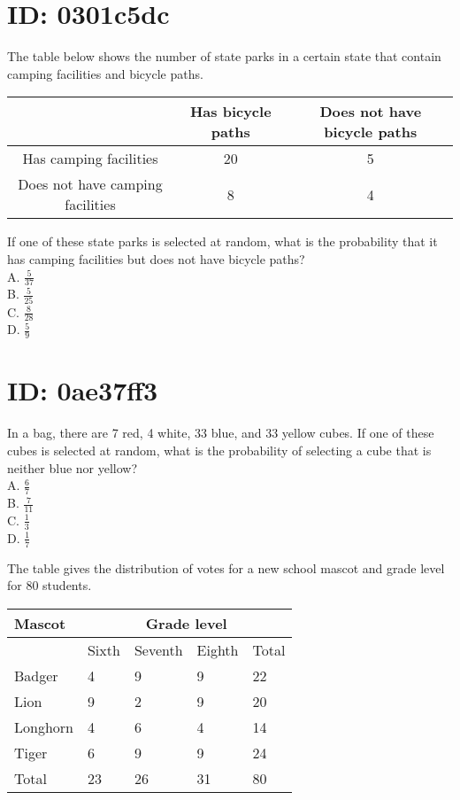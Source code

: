 \section*{ID: 0301c5dc}
The table below shows the number of state parks in a certain state that contain camping facilities and bicycle paths.

\begin{center}
\begin{tabular}{|c|c|c|}
\hline
 & Has bicycle paths & Does not have bicycle paths \\
\hline
Has camping facilities & 20 & 5 \\
\hline
Does not have camping facilities & 8 & 4 \\
\hline
\end{tabular}
\end{center}

If one of these state parks is selected at random, what is the probability that it has camping facilities but does not have bicycle paths?\\
A. $\frac{5}{37}$\\
B. $\frac{5}{25}$\\
C. $\frac{8}{28}$\\
D. $\frac{5}{9}$

\section*{ID: 0ae37ff3}
In a bag, there are 7 red, 4 white, 33 blue, and 33 yellow cubes. If one of these cubes is selected at random, what is the probability of selecting a cube that is neither blue nor yellow?\\
A. $\frac{6}{7}$\\
B. $\frac{7}{11}$\\
C. $\frac{1}{3}$\\
D. $\frac{1}{7}$

The table gives the distribution of votes for a new school mascot and grade level for 80 students.

\begin{center}
\begin{tabular}{|l|l|l|l|l|}
\hline
\multirow[b]{2}{*}{Mascot} & \multicolumn{4}{|c|}{Grade level} \\
\hline
 & Sixth & Seventh & Eighth & Total \\
\hline
Badger & 4 & 9 & 9 & 22 \\
\hline
Lion & 9 & 2 & 9 & 20 \\
\hline
Longhorn & 4 & 6 & 4 & 14 \\
\hline
Tiger & 6 & 9 & 9 & 24 \\
\hline
Total & 23 & 26 & 31 & 80 \\
\hline
\end{tabular}
\end{center}


